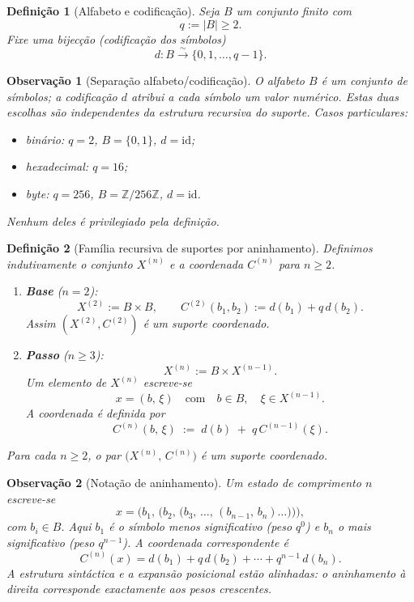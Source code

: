 \documentclass[11pt,a4paper]{article}
\newtheorem{definicao}{Definição}
\newtheorem{observacao}{Observação}
\begin{document}
\begin{definicao}[Alfabeto e codificação]
\label{def:alfabeto}
Seja \(B\) um conjunto finito com
\[
q
:=
\lvert B\rvert
\ge 2.
\]
Fixe uma bijecção (codificação dos símbolos)
\[
d\colon B\overset{\sim}{\longrightarrow}\{0,1,\dots,q-1\}.
\]
\end{definicao}

\begin{observacao}[Separação alfabeto/codificação]
\label{obs:alfabeto-codificacao}
O alfabeto \(B\) é um conjunto de símbolos; a codificação \(d\) atribui a cada símbolo um valor numérico.
Estas duas escolhas são independentes da estrutura recursiva do suporte.
Casos particulares:
\begin{itemize}[leftmargin=1.5em]
\item binário: \(q=2\), \(B=\{0,1\}\), \(d=\mathrm{id}\);
\item hexadecimal: \(q=16\);
\item byte: \(q=256\), \(B=\mathbb Z/256\mathbb Z\), \(d=\mathrm{id}\).
\end{itemize}
Nenhum deles é privilegiado pela definição.
\end{observacao}

\begin{definicao}[Família recursiva de suportes por aninhamento]
\label{def:suporte-aninhado}
Definimos indutivamente o conjunto \(X^{(n)}\) e a coordenada \(C^{(n)}\) para \(n\ge 2\).

\begin{enumerate}[leftmargin=1.5em]
\item \textbf{Base} (\(n=2\)):
\[
X^{(2)}
:=
B\times B,
\qquad
C^{(2)}(b_1,b_2)
:=
d(b_1)
+
q\,d(b_2).
\]
Assim \((X^{(2)},C^{(2)})\) é um suporte coordenado.

\item \textbf{Passo} (\(n\ge 3\)):
\[
X^{(n)}
:=
B\times X^{(n-1)}.
\]
Um elemento de \(X^{(n)}\) escreve-se
\[
x
=
(b,\, \xi)
\quad\text{com}\quad
b\in B,\quad
\xi\in X^{(n-1)}.
\]
A coordenada é definida por
\[
C^{(n)}(b,\, \xi)
\;:=\;
d(b)
\;+\;
q\, C^{(n-1)}(\xi).
\]
\end{enumerate}

Para cada \(n\ge 2\), o par \(\bigl(X^{(n)},\, C^{(n)}\bigr)\) é um suporte coordenado.
\end{definicao}

\begin{observacao}[Notação de aninhamento]
\label{obs:aninhamento}
Um estado de comprimento \(n\) escreve-se
\[
x
=
\bigl(
b_1,\,
\bigl(
b_2,\,
\bigl(
b_3,\,
\dots,\,
(b_{n-1},\, b_n)
\dots
\bigr)
\bigr)
\bigr),
\]
com \(b_i\in B\).
Aqui \(b_1\) é o símbolo menos significativo (peso \(q^0\)) e \(b_n\) o mais significativo (peso \(q^{n-1}\)).
A coordenada correspondente é
\[
C^{(n)}(x)
=
d(b_1)
+
q\,d(b_2)
+
\cdots
+
q^{n-1}\,d(b_n).
\]
A estrutura sintáctica e a expansão posicional estão alinhadas: o aninhamento à direita corresponde exactamente aos pesos crescentes.
\end{observacao}
\end{document}

